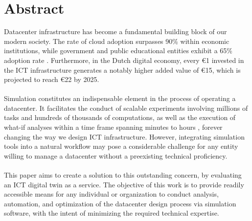 \section*{Abstract}
Datacenter infrastructure has become a fundamental building block of our modern society. The rate of cloud adoption surpasses 90\% within economic institutions, while government and public educational entities exhibit a 65\% adoption rate \cite{iosup2022future}.
Furthermore, in the Dutch digital economy, every €1 invested in the ICT infrastructure generates a notably higher added value of €15, which is projected to reach €22 by 2025.
\\\\
% 
Simulation constitutes an indispensable element in the process of operating a datacenter. It facilitates the conduct of scalable experiments involving millions of tasks and hundreds of thousands of computations, as well as the execution of what-if analyses within a time frame spanning minutes to hours \cite{DBLP:conf/ccgrid/MastenbroekAI+21}, forever changing the way we design ICT infrastructure. However, integrating simulation tools into a natural workflow may pose a considerable challenge for any entity willing to manage a datacenter without a preexisting technical proficiency.
\\\\
This paper aims to create a solution to this outstanding concern, by evaluating an ICT digital twin as a service. The objective of this work is to provide readily accessible means for any individual or organization to conduct analysis, automation, and optimization of the datacenter design process via simulation software, with the intent of minimizing the required technical expertise.